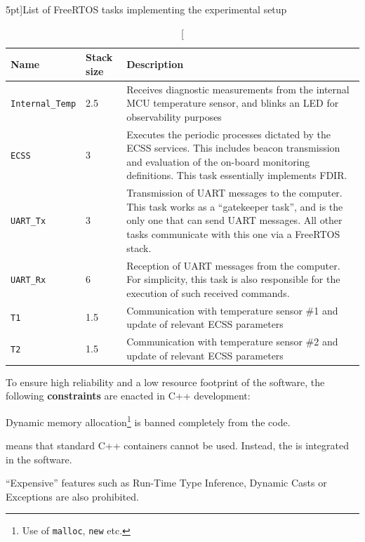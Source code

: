 \documentclass[a4paper,nobib]{tufte-book}
\begin{document}
\begin{table}[h]
	\centering
	\caption[][5pt]{List of Free\acs{RTOS} tasks implementing the experimental setup}
	\label{tab:rtos-tasks}
	\renewcommand{\arraystretch}{1.5}
	\begin{tabularx}{\textwidth}{@{}llX@{}}
		\toprule
		Name & Stack size & Description \\ \midrule
		\texttt{Internal\_Temp} & \SI{2.5}{\kilo\byte} & Receives diagnostic measurements from the internal \acs{MCU} temperature sensor, and blinks an \acs{LED} for observability purposes \\
		\texttt{ECSS} & \SI{3}{\kilo\byte} & Executes the periodic processes dictated by the \acs{ECSS} services. This includes beacon transmission and evaluation of the on-board monitoring definitions. This task essentially implements \acs{FDIR}. \\
		\texttt{\acs{UART}\_Tx} & \SI{3}{\kilo\byte} & Transmission of \acs{UART} messages to the computer. This task works as a ``gatekeeper task'', and is the only one that can send \acs{UART} messages. All other tasks communicate with this one via a Free\acs{RTOS} stack. \\
		\texttt{\acs{UART}\_Rx} & \SI{6}{\kilo\byte} & Reception of \acs{UART} messages from the computer. For simplicity, this task is also responsible for the execution of such received commands. \\
		\texttt{T1} & \SI{1.5}{\kilo\byte} & Communication with temperature sensor \#1 and update of relevant \acs{ECSS} parameters \\
		\texttt{T2} & \SI{1.5}{\kilo\byte} & Communication with temperature sensor \#2 and update of relevant \acs{ECSS} parameters \\ \bottomrule
	\end{tabularx}
\end{table}

To ensure high reliability and a low resource footprint of the software, the following \textbf{constraints} are enacted in C++ development:
\begin{compactenum}
	\item Dynamic memory allocation\footnote{Use of \texttt{malloc}, \texttt{new} etc.} is banned completely from the code.
	\label{itm:malloc}
	\item {} means that standard C++ containers cannot be used. Instead, the  is integrated in the software.
	\item ``Expensive'' features such as Run-Time Type Inference, Dynamic Casts or Exceptions are also prohibited.
\end{compactenum}
\end{document}
